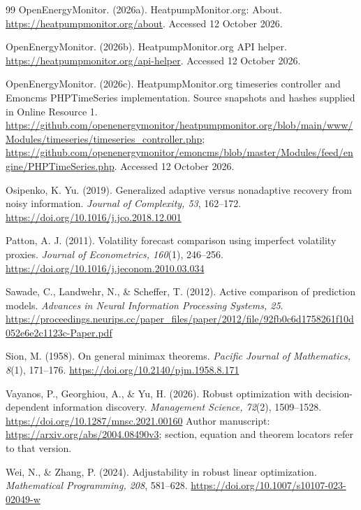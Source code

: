 \documentclass[12pt]{article}
\begin{document}
\begin{thebibliography}{99}
OpenEnergyMonitor. (2026a). HeatpumpMonitor.org: About.
\url{https://heatpumpmonitor.org/about}. Accessed 12 October 2026.

OpenEnergyMonitor. (2026b). HeatpumpMonitor.org API helper.
\url{https://heatpumpmonitor.org/api-helper}. Accessed 12 October 2026.

OpenEnergyMonitor. (2026c). HeatpumpMonitor.org timeseries controller and
Emoncms PHPTimeSeries implementation. Source snapshots and hashes supplied
in Online Resource 1.
\url{https://github.com/openenergymonitor/heatpumpmonitor.org/blob/main/www/Modules/timeseries/timeseries_controller.php};
\url{https://github.com/openenergymonitor/emoncms/blob/master/Modules/feed/engine/PHPTimeSeries.php}.
Accessed 12 October 2026.

Osipenko, K. Yu. (2019). Generalized adaptive versus nonadaptive recovery
from noisy information. \emph{Journal of Complexity, 53}, 162--172.
\url{https://doi.org/10.1016/j.jco.2018.12.001}

Patton, A. J. (2011). Volatility forecast comparison using imperfect
volatility proxies. \emph{Journal of Econometrics, 160}(1), 246--256.
\url{https://doi.org/10.1016/j.jeconom.2010.03.034}

Sawade, C., Landwehr, N., \& Scheffer, T. (2012).
Active comparison of prediction models.
\emph{Advances in Neural Information Processing Systems, 25}.
\url{https://proceedings.neurips.cc/paper_files/paper/2012/file/92fb0c6d1758261f10d052e6e2c1123c-Paper.pdf}

Sion, M. (1958). On general minimax theorems.
\emph{Pacific Journal of Mathematics, 8}(1), 171--176.
\url{https://doi.org/10.2140/pjm.1958.8.171}

Vayanos, P., Georghiou, A., \& Yu, H. (2026).
Robust optimization with decision-dependent information discovery.
\emph{Management Science, 72}(2), 1509--1528.
\url{https://doi.org/10.1287/mnsc.2021.00160}
Author manuscript: \url{https://arxiv.org/abs/2004.08490v3};
section, equation and theorem locators refer to that version.

Wei, N., \& Zhang, P. (2024). Adjustability in robust linear optimization.
\emph{Mathematical Programming, 208}, 581--628.
\url{https://doi.org/10.1007/s10107-023-02049-w}
\end{thebibliography}
\end{document}
